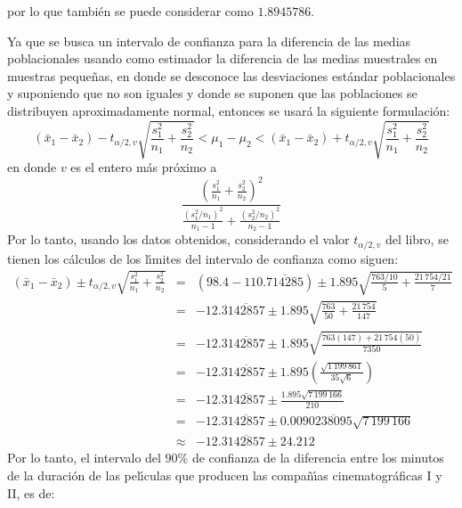 \begin{solucion}
\begin{verbatim}
 \end{verbatim}
 \vspace{-0.5cm}
 por lo que tambi\'en se puede considerar como $1.8945786$.
 \par 
 Ya que se busca un intervalo de confianza para la diferencia de las medias poblacionales usando como estimador la diferencia de las medias muestrales en muestras peque\~nas, en donde se desconoce las desviaciones est\'andar poblacionales y suponiendo que no son iguales y donde se suponen que las poblaciones se distribuyen aproximadamente normal, entonces se usar\'a la siguiente formulaci\'on:
 \begin{equation*}
  \left( \bar{x}_1 - \bar{x}_2 \right) - t_{\alpha/2,v} \sqrt{\frac{s_1^2}{n_1} + \frac{s_2^2}{n_2}} < \mu_1 - \mu_2 < \left( \bar{x}_1 - \bar{x}_2 \right) + t_{\alpha/2,v} \sqrt{\frac{s_1^2}{n_1} + \frac{s_2^2}{n_2}}
 \end{equation*}
 en donde $v$ es el entero m\'as pr\'oximo a
 \begin{equation*}
  \frac{\displaystyle{ \left( \frac{s_1^2}{n_1} + \frac{s_2^2}{n_2} \right)^2 }}{\displaystyle{ \frac{\left( s_1^2/n_1 \right)^2}{n_1 - 1} + \frac{\left( s_2^2/n_2 \right)^2}{n_2 - 1} }}
 \end{equation*}
 Por lo tanto, usando los datos obtenidos, considerando el valor $t_{\alpha/2,v}$ del libro, se tienen los c\'alculos de los l\'{\i}mites del intervalo de confianza como siguen:
 \begin{eqnarray*}
  \left( \bar{x}_1 - \bar{x}_2 \right) \pm t_{\alpha/2,v} \sqrt{\frac{s_1^2}{n_1} + \frac{s_2^2}{n_2}} & = & (98.4 - 110.\overline{714285}) \pm 1.895 \sqrt{\frac{763/10}{5} + \frac{21\,754/21}{7}} \\
  & = & -12.3\overline{142857} \pm 1.895\sqrt{\frac{763}{50} + \frac{21\,754}{147}} \\
  & = & -12.3\overline{142857} \pm 1.895 \sqrt{\frac{763(147)+21\,754(50)}{7350}} \\
  & = & -12.3\overline{142857} \pm 1.895\left( \frac{\sqrt{ 1\,199\,861 }}{35\sqrt{6}} \right) \\
  & = &  -12.3\overline{142857} \pm  \frac{1.895\sqrt{ 7\,199\,166 }}{210} \\
  & = & -12.3\overline{142857} \pm 0.0090\overline{238095}\sqrt{7\,199\,166} \\
  & \approx & -12.3\overline{142857} \pm 24.212
 \end{eqnarray*}
 Por lo tanto, el intervalo del $90\%$ de confianza de la diferencia entre los minutos de la duraci\'on de las pel\'{\i}culas que producen las compa\~n\'{\i}as cinematogr\'aficas I y II, es de:

\end{solucion}
